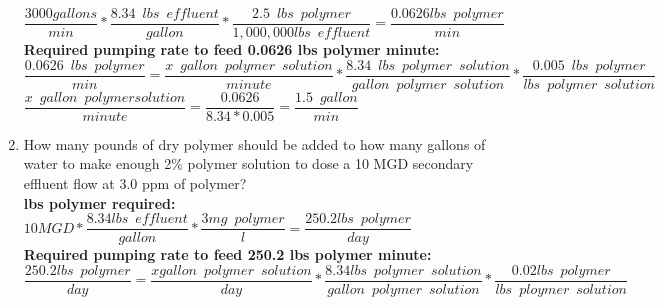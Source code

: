 \begin{enumerate}
$\dfrac{3000 gallons}{min}*\dfrac{8.34 \enspace lbs \enspace effluent}{gallon}*\dfrac{2.5 \enspace lbs \enspace polymer}{1,000,000 lbs \enspace effluent}=\dfrac{0.0626 lbs \enspace polymer}{min}$\\
\vspace{0.25cm}
\textbf{Required pumping rate to feed 0.0626 lbs polymer minute:}\\
\vspace{0.25cm}
$\dfrac{0.0626 \enspace lbs \enspace polymer}{min}=\dfrac{x \enspace gallon \enspace polymer  \enspace solution}{minute}*\dfrac{8.34 \enspace lbs \enspace polymer \enspace solution}{gallon \enspace polymer \enspace solution}*\dfrac{0.005 \enspace lbs \enspace polymer}{lbs \enspace polymer \enspace solution}$\\
\vspace{0.25cm}
$\dfrac{x \enspace gallon \enspace polymer solution}{minute}=\dfrac{0.0626}{8.34*0.005}=\boxed{\dfrac{1.5 \enspace gallon}{min}}$\\
\vspace{0.25cm}
\item How many pounds of dry polymer should be added to how many gallons  of water  to make enough 2\% polymer  solution to dose a 10 MGD secondary  effluent flow at 3.0 ppm of polymer?\\
\vspace{0.25cm}
\textbf{lbs polymer required:}\\
\vspace{0.25cm}
$10 MGD*\dfrac{8.34lbs \enspace effluent}{gallon}*\dfrac{3mg \enspace polymer}{l}=\dfrac{250.2 lbs \enspace polymer}{day}$\\
\vspace{0.25cm}
\textbf{Required pumping rate to feed 250.2 lbs polymer minute:}\\
\vspace{0.25cm}
$\dfrac{250.2 lbs \enspace polymer}{day}=\dfrac{x gallon \enspace polymer \enspace solution}{day}*\dfrac{8.34 lbs \enspace polymer \enspace solution}{gallon \enspace polymer \enspace solution}*\dfrac{0.02 lbs \enspace polymer}{lbs \enspace ploymer \enspace solution}$\\


\end{enumerate}
